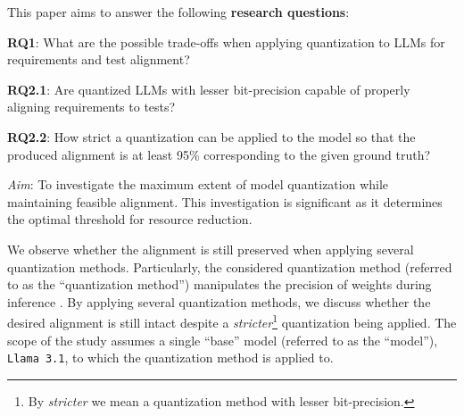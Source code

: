 \documentclass[conference]{IEEEtran}
\begin{document}




This paper aims to answer the following \textbf{research questions}:

\begin{tcolorbox}
\noindent
\textbf{RQ1}: What are the possible trade-offs when applying quantization to LLMs for requirements and test alignment?

\noindent
\textbf{RQ2.1}: Are quantized LLMs with lesser bit-precision capable of properly aligning requirements to tests?

\noindent
\textbf{RQ2.2}: How strict a quantization can be applied to the model so that the
produced alignment is at least 95\% corresponding to the given ground truth?

\setlength\parindent{6pt}
\textit{Aim}: To investigate the maximum extent of model quantization while
maintaining feasible alignment. This investigation is significant as it
determines the optimal threshold for resource reduction.
\end{tcolorbox}

We observe whether the alignment is still preserved when applying several
quantization methods. Particularly, the considered quantization method (referred
to as the ``quantization method'') manipulates the precision of weights during inference \cite{egashiraExploitingLLMQuantization2024}.
By applying several quantization methods, we discuss whether the desired
alignment is still intact despite a \textit{stricter}\footnote{By \textit{stricter} we mean a quantization method with lesser bit-precision.} quantization being applied. 
The scope of the study assumes a single ``base'' model (referred to as the
``model''), \verb|Llama 3.1|, to which the quantization method is applied to.
\end{document}
